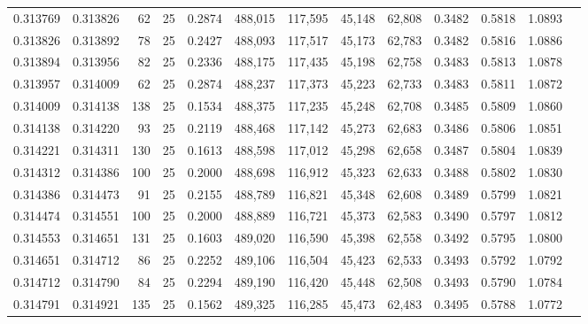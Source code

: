 \begin{tabular}{rrrrrrrrrrrrr}
0.313769 & 0.313826 &    62 &  25 &                                     0.2874 & 488,015 & 117,595 &  45,148 &  62,808 & 0.3482 & 0.5818 & 1.0893 \\
0.313826 & 0.313892 &    78 &  25 &                                     0.2427 & 488,093 & 117,517 &  45,173 &  62,783 & 0.3482 & 0.5816 & 1.0886 \\
0.313894 & 0.313956 &    82 &  25 &                                     0.2336 & 488,175 & 117,435 &  45,198 &  62,758 & 0.3483 & 0.5813 & 1.0878 \\
0.313957 & 0.314009 &    62 &  25 &                                     0.2874 & 488,237 & 117,373 &  45,223 &  62,733 & 0.3483 & 0.5811 & 1.0872 \\
0.314009 & 0.314138 &   138 &  25 &                                     0.1534 & 488,375 & 117,235 &  45,248 &  62,708 & 0.3485 & 0.5809 & 1.0860 \\
0.314138 & 0.314220 &    93 &  25 &                                     0.2119 & 488,468 & 117,142 &  45,273 &  62,683 & 0.3486 & 0.5806 & 1.0851 \\
0.314221 & 0.314311 &   130 &  25 &                                     0.1613 & 488,598 & 117,012 &  45,298 &  62,658 & 0.3487 & 0.5804 & 1.0839 \\
0.314312 & 0.314386 &   100 &  25 &                                     0.2000 & 488,698 & 116,912 &  45,323 &  62,633 & 0.3488 & 0.5802 & 1.0830 \\
0.314386 & 0.314473 &    91 &  25 &                                     0.2155 & 488,789 & 116,821 &  45,348 &  62,608 & 0.3489 & 0.5799 & 1.0821 \\
0.314474 & 0.314551 &   100 &  25 &                                     0.2000 & 488,889 & 116,721 &  45,373 &  62,583 & 0.3490 & 0.5797 & 1.0812 \\
0.314553 & 0.314651 &   131 &  25 &                                     0.1603 & 489,020 & 116,590 &  45,398 &  62,558 & 0.3492 & 0.5795 & 1.0800 \\
0.314651 & 0.314712 &    86 &  25 &                                     0.2252 & 489,106 & 116,504 &  45,423 &  62,533 & 0.3493 & 0.5792 & 1.0792 \\
0.314712 & 0.314790 &    84 &  25 &                                     0.2294 & 489,190 & 116,420 &  45,448 &  62,508 & 0.3493 & 0.5790 & 1.0784 \\
0.314791 & 0.314921 &   135 &  25 &                                     0.1562 & 489,325 & 116,285 &  45,473 &  62,483 & 0.3495 & 0.5788 & 1.0772 \\

\end{tabular}

